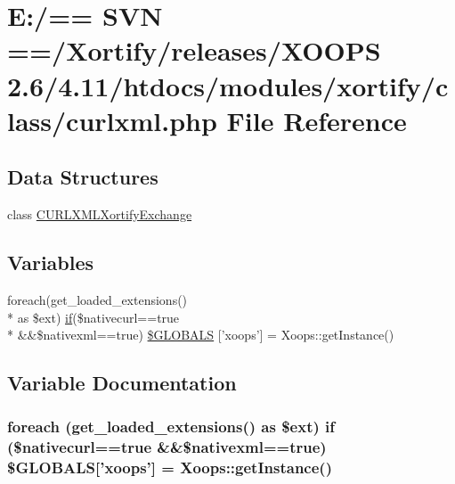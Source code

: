 \hypertarget{curlxml_8php}{\section{E\-:/== S\-V\-N ==/\-Xortify/releases/\-X\-O\-O\-P\-S 2.6/4.11/htdocs/modules/xortify/class/curlxml.php File Reference}
\label{curlxml_8php}
}
\subsection*{Data Structures}
\begin{DoxyCompactItemize}
\item 
class \hyperlink{class_c_u_r_l_x_m_l_xortify_exchange}{C\-U\-R\-L\-X\-M\-L\-Xortify\-Exchange}
\end{DoxyCompactItemize}
\subsection*{Variables}
\begin{DoxyCompactItemize}
\item 
foreach(get\-\_\-loaded\-\_\-extensions() \\*
as \$ext) \hyperlink{poll_2index_8php_ae404acbb304be6b6ac443de921697faf}{if}(\$nativecurl==true \\*
\&\&\$nativexml==true) \hyperlink{curlxml_8php_ada6200c7fa12b633a7d6f6f54ff17e13}{\$\-G\-L\-O\-B\-A\-L\-S} \mbox{[}'xoops'\mbox{]} = Xoops\-::get\-Instance()
\end{DoxyCompactItemize}


\subsection{Variable Documentation}
\hypertarget{curlxml_8php_ada6200c7fa12b633a7d6f6f54ff17e13}{
\subsubsection[{\$\-G\-L\-O\-B\-A\-L\-S}]{\setlength{\rightskip}{0pt plus 5cm}foreach (get\-\_\-loaded\-\_\-extensions() as \$ext) {\bf if} (\$nativecurl==true \&\&\$nativexml==true) \$G\-L\-O\-B\-A\-L\-S\mbox{[}'xoops'\mbox{]} = Xoops\-::get\-Instance()}}\label{curlxml_8php_ada6200c7fa12b633a7d6f6f54ff17e13}

